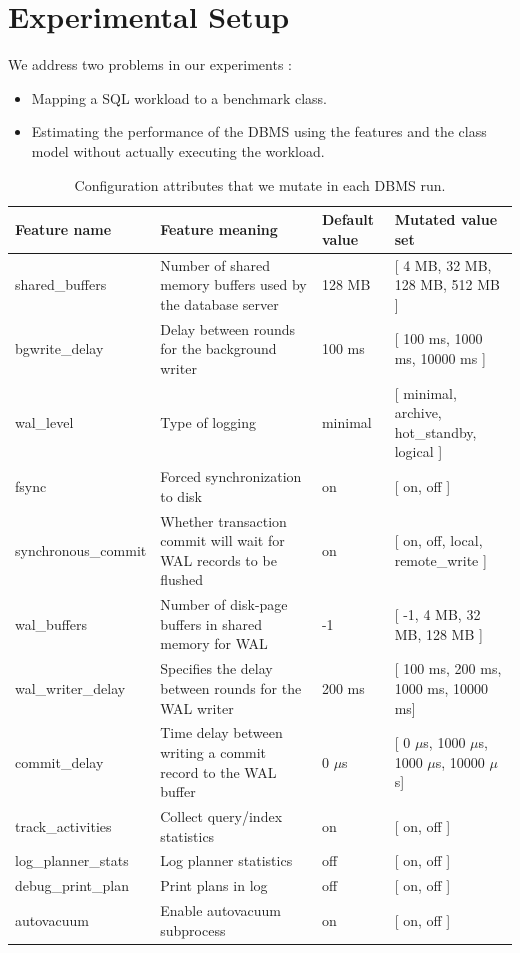 \section{Experimental Setup} \label{sec:eval}

We address two problems in our experiments :\\

\begin{itemize}
	\item Mapping a SQL workload to a benchmark class.
	\item Estimating the performance of the DBMS using the features and the class
	model without actually executing the workload.\\
\end{itemize}

\begin{table}
\centering
  \begin{adjustbox}{max width=\textwidth}
  \begin{tabular}{l|lll} 
	\toprule
   		Feature name &  Feature meaning & Default value & Mutated value set \\
    \midrule
    	shared\_buffers & Number of shared memory buffers used by the database
    	server & 128 MB &  [ 4 MB, 32 MB, 128 MB, 512 MB ] \\
    	bgwrite\_delay &  Delay between rounds for the
    	background writer & 100 ms &  [ 100 ms, 1000 ms, 10000 ms ] \\
    	wal\_level & Type of logging & minimal &  [ minimal, archive, hot\_standby,
    	logical ] \\
    	fsync & Forced synchronization to disk & on &  [ on, off ] \\
    	synchronous\_commit & Whether transaction commit will wait for WAL records to be flushed & on &  [ on, off, local,
    	remote\_write ] \\
    	wal\_buffers & Number of disk-page buffers in shared memory for WAL & 
    	-1 &  [ -1, 4 MB, 32 MB, 128 MB ] \\
    	wal\_writer\_delay & Specifies the delay between rounds for the
    	WAL writer & 200 ms &  [ 100 ms, 200 ms, 1000 ms, 10000 ms] \\
    	commit\_delay & Time delay between writing a commit record to the WAL
    	buffer & 0 $\mu$s &  [ 0 $\mu$s, 1000 $\mu$s, 1000 $\mu$s, 10000 $\mu$s] \\
    	track\_activities & Collect query/index statistics  & on &  [ on, off ]	\\
    	log\_planner\_stats & Log planner statistics  & off &  [ on, off ] \\
    	debug\_print\_plan & Print plans in log  & off &  [ on, off ] \\
    	autovacuum & Enable autovacuum subprocess  & on &  [ on, off ] \\    	    	
   \bottomrule
   \end{tabular}
   \end{adjustbox}   
\caption{Configuration attributes that we mutate in each DBMS run.}
\label{tab:mutate}
\end{table}


